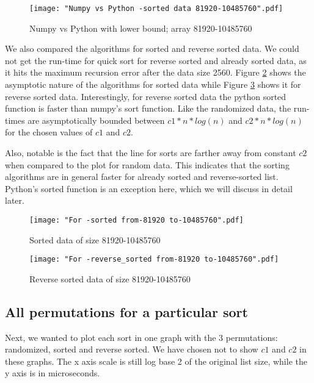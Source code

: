 \documentclass[sigconf, nonacm, natbib, screen, balance=False]{acmart}
\begin{document}
\begin{figure}[ht]
\texttt{[image: "Numpy vs Python -sorted data 81920-10485760".pdf]}
    \caption{Numpy vs Python with lower bound; array 81920-10485760 }
    \label{fig:numpyvspython}
\end{figure}

We also compared the algorithms for sorted and reverse sorted data. We could not get the run-time for quick sort for reverse sorted and already sorted data, as it hits the maximum recursion error after the data size 2560. Figure \ref{fig:sorted1} shows the asymptotic nature of the algorithms for sorted data while Figure \ref{fig:rsorted1} shows it for reverse sorted data. \newline
Interestingly, for reverse sorted data the python sorted function is faster than numpy's sort function. Like the randomized data, the run-times are asymptotically bounded between $c1*n*log(n)$  and $c2*n*log(n)$ for the chosen values of $c1$ and $c2$.

Also, notable is the fact that the line for sorts are farther away from constant $c2$ when compared to the plot for random data. This indicates that the sorting algorithms are in general faster for already sorted and reverse-sorted list. Python's sorted function is an exception here, which we will discuss in detail later.

\begin{figure}[ht]
\texttt{[image: "For -sorted from-81920 to-10485760".pdf]}
    \caption{Sorted data of size 81920-10485760 }
    \label{fig:sorted1}
\end{figure}

\begin{figure}[ht]
\texttt{[image: "For -reverse\_sorted from-81920 to-10485760".pdf]}
    \caption{Reverse sorted data of size 81920-10485760 }
    \label{fig:rsorted1}
\end{figure}

\subsection{All permutations for a particular sort }\label{allpermut}

Next, we wanted to plot each sort in one graph with the 3 permutations: randomized, sorted and reverse sorted. We have chosen not to show $c1$ and $c2$ in these graphs. The x axis scale is still log base 2 of the original list size, while the y axis is in microseconds.
\end{document}
